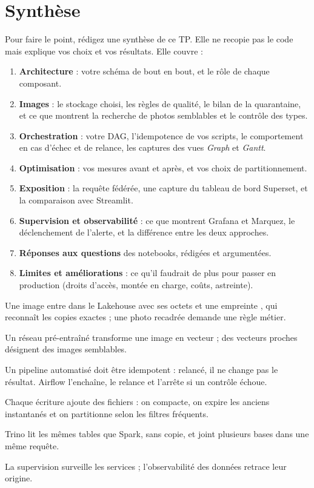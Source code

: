 \section{Synthèse}\label{c5:sec:livrables}

Pour faire le point, rédigez une synthèse de ce TP. Elle ne recopie pas le code mais explique
vos choix et vos résultats. Elle couvre :
\begin{enumerate}[leftmargin=*,itemsep=2pt]
  \item \textbf{Architecture} : votre schéma de bout en bout, et le rôle de chaque composant.
  \item \textbf{Images} : le stockage choisi, les règles de qualité, le bilan de la quarantaine, et ce
        que montrent la recherche de photos semblables et le contrôle des types.
  \item \textbf{Orchestration} : votre DAG, l'idempotence de vos scripts, le comportement en cas
        d'échec et de relance, les captures des vues \emph{Graph} et \emph{Gantt}.
  \item \textbf{Optimisation} : vos mesures avant et après, et vos choix de partitionnement.
  \item \textbf{Exposition} : la requête fédérée, une capture du tableau de bord Superset, et la
        comparaison avec Streamlit.
  \item \textbf{Supervision et observabilité} : ce que montrent Grafana et Marquez, le déclenchement de l'alerte,
        et la différence entre les deux approches.
  \item \textbf{Réponses aux questions} des notebooks, rédigées et argumentées.
  \item \textbf{Limites et améliorations} : ce qu'il faudrait de plus pour passer en production
        (droits d'accès, montée en charge, coûts, astreinte).
\end{enumerate}

\begin{aretenir}
  \item Une image entre dans le Lakehouse avec ses octets et une empreinte , qui reconnaît les copies exactes ; une photo recadrée demande une règle métier.
  \item Un réseau pré-entraîné transforme une image en vecteur ; des vecteurs proches désignent des images semblables.
  \item Un pipeline automatisé doit être idempotent : relancé, il ne change pas le résultat. Airflow l'enchaîne, le relance et l'arrête si un contrôle échoue.
  \item Chaque écriture ajoute des fichiers : on compacte, on expire les anciens instantanés et on partitionne selon les filtres fréquents.
  \item Trino lit les mêmes tables que Spark, sans copie, et joint plusieurs bases dans une même requête.
  \item La supervision surveille les services ; l'observabilité des données retrace leur origine.
\end{aretenir}

